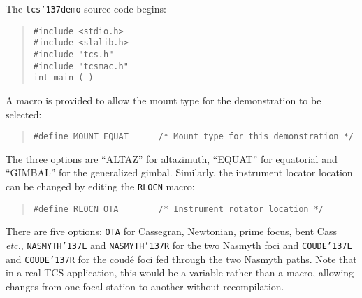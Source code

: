 \documentclass[12pt,fleqn,twoside]{article}
\renewcommand{\_}{{\tt\char'137}}     %
\begin{document}
The {\tt tcs\_demo} source code begins:
\begin{quote}
\begin{small}
\begin{verbatim}
#include <stdio.h>
#include <slalib.h>
#include "tcs.h"
#include "tcsmac.h"
int main ( )
\end{verbatim}\end{small}
\end{quote}
A macro is provided to allow the mount type
for the demonstration to be selected:
\begin{quote}
\begin{small}
\begin{verbatim}
#define MOUNT EQUAT      /* Mount type for this demonstration */
\end{verbatim}\end{small}
\end{quote}
The three options are ``ALTAZ'' for altazimuth, ``EQUAT'' for
equatorial and ``GIMBAL'' for the generalized gimbal.
Similarly, the instrument locator location can be changed by editing
the {\tt RLOCN} macro:
\begin{quote}
\begin{small}
\begin{verbatim}
#define RLOCN OTA        /* Instrument rotator location */
\end{verbatim}\end{small}
\end{quote}
There are five options: {\tt OTA} for Cassegran, Newtonian, prime focus,
bent Cass {\it etc.}, {\tt NASMYTH\_L} and {\tt NASMYTH\_R} for the
two Nasmyth foci and {\tt COUDE\_L} and {\tt COUDE\_R} for the
coud\'{e} foci fed through the two Nasmyth paths.  Note
that in a real TCS application, this would be a variable rather
than a macro, allowing changes from one focal station to another without
recompilation.
\end{document}
